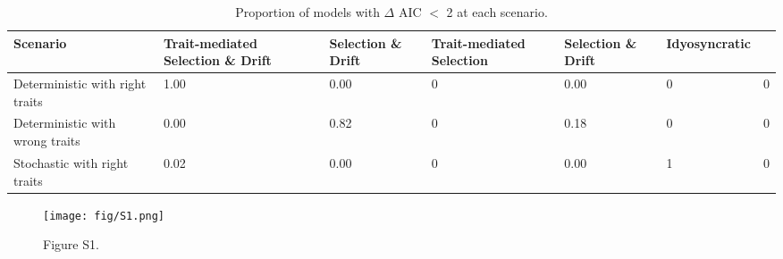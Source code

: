 
\begin{table}[!ht]

\caption{\label{tab:table-prop}Proportion of models with {$\Delta$} AIC {$<$}  2 at each scenario.}
\centering
\begin{tabular}[t]{p{3cm}p{2.5cm}p{2.5cm}p{2.5cm}p{2.5cm}p{2.5cm}p{2.5cm}}
\toprule
\textbf{Scenario} & \textbf{Trait-mediated Selection} \& \textbf{Drift} & \textbf{Selection \& Drift} & \textbf{Trait-mediated Selection} & \textbf{Selection \& Drift} & \textbf{Idyosyncratic}\\
\hline
Deterministic with right traits & 1.00 & 0.00 & 0 & 0.00 & 0 & 0\\
Deterministic with wrong traits & 0.00 & 0.82 & 0 & 0.18 & 0 & 0\\
Stochastic with right traits & 0.02 & 0.00 & 0 & 0.00 & 1 & 0\\
\bottomrule
\end{tabular}
\end{table}

\begin{figure}
\centering
\texttt{[image: fig/S1.png]}
\caption{Figure S1.}
\end{figure}


